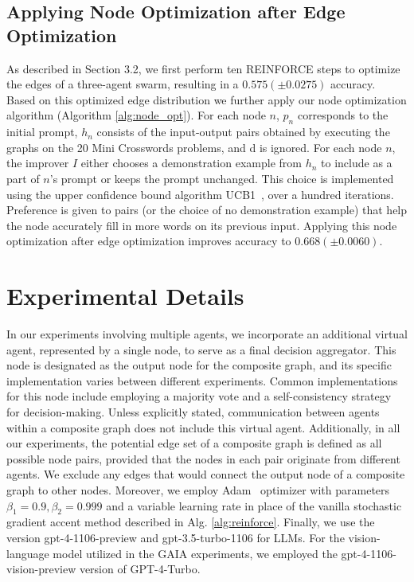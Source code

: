 \documentclass{article}
\theoremstyle{plain}
\theoremstyle{definition}
\theoremstyle{remark}
\begin{document}
\subsection{Applying Node Optimization after Edge Optimization}
As described in Section 3.2, we first perform ten REINFORCE steps to optimize the edges of a three-agent swarm, resulting in a $0.575(\pm0.0275)$ accuracy.
Based on this optimized edge distribution we further apply our node optimization algorithm (Algorithm \ref{alg:node_opt}).
For each node $n$, $p_n$ corresponds to the initial prompt, $h_n$ consists of the input-output pairs obtained by executing the graphs on the 20 Mini Crosswords problems, and d is ignored.
For each node $n$, the improver $I$ either chooses a demonstration example from $h_n$ to include as a part of $n$’s prompt or keeps the prompt unchanged.
This choice is implemented using the upper confidence bound algorithm UCB1~\citep{auer2002finite}, over a hundred iterations.
Preference is given to pairs (or the choice of no demonstration example) that help the node accurately fill in more words on its previous input.
Applying this node optimization after edge optimization improves accuracy to $0.668 (\pm 0.0060)$. 


\section{Experimental Details}
\label{app:experiment}
In our experiments involving multiple agents, we incorporate an additional virtual agent, represented by a single node, to serve as a final decision aggregator.
This node is designated as the output node for the composite graph, and its specific implementation varies between different experiments.
Common implementations for this node include employing a majority vote and a self-consistency strategy for decision-making.
Unless explicitly stated, communication between agents within a composite graph does not include this virtual agent.
Additionally, in all our experiments, the potential edge set of a composite graph is defined as all possible node pairs, provided that the nodes in each pair originate from different agents.
We exclude any edges that would connect the output node of a composite graph to other nodes.
Moreover, we employ Adam~\citep{kingma2014adam} optimizer with parameters $\beta_1 = 0.9, \beta_2 = 0.999$ and a variable learning rate in place of the vanilla stochastic gradient accent method described in Alg. \ref{alg:reinforce}. Finally, we use the version gpt-4-1106-preview and gpt-3.5-turbo-1106 for LLMs. For the vision-language model utilized in the GAIA experiments, we employed the gpt-4-1106-vision-preview version of GPT-4-Turbo.
\end{document}
